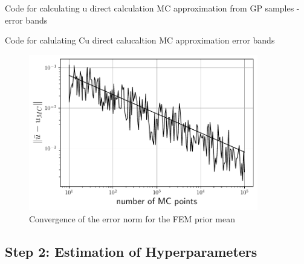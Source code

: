 \documentclass[%
  a4paper,oneside,%
  11pt,%
  smallchapters,
  green,%
  rgb, <cmyk>
  ,]{tubsbook}
\begin{document}
Code for calculating u
direct calculation
MC approximation from GP samples
-error bands

Code for calulating Cu
direct calucaltion
MC approximation
error bands


\begin{figure}[h]
\includegraphics[width=10cm]{pics/MCerrorConv.pdf}
\centering
\caption{Convergence of the error norm for the FEM prior mean}
\end{figure}
\label{fig:u_mean_conv}



\subsection{Step 2: Estimation of Hyperparameters }
\end{document}
